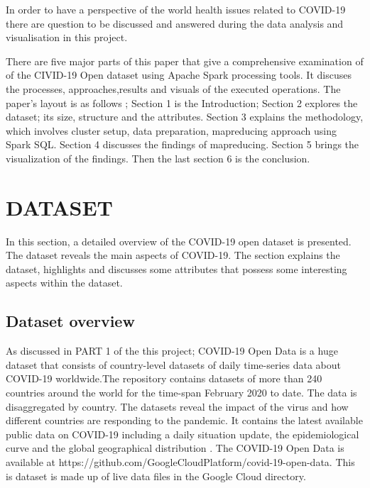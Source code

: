 \documentclass[12pt]{article}
\begin{document}
 In order to  have a perspective of the world health issues related to COVID-19 there are question to be discussed and answered during the data analysis and visualisation in this project.
 
There are five major parts of this paper that give a comprehensive examination of of the CIVID-19 Open dataset using Apache Spark processing tools. It discuses the processes, approaches,results and visuals of the executed operations. The paper's layout is as follows ; Section 1 is the Introduction; Section 2 explores the dataset; its size, structure and the attributes. Section 3 explains the methodology, which involves cluster setup, data preparation, mapreducing approach using Spark SQL. Section 4 discusses the findings of mapreducing. Section 5 brings the visualization of the findings. Then the last section 6 is the conclusion.

\section{DATASET}
 In this  section, a detailed overview of the COVID-19 open dataset is presented. The dataset reveals the main aspects of COVID-19. The section explains the dataset, highlights and discusses some attributes that possess some interesting aspects  within the dataset.

\subsection{Dataset overview}

 As discussed in PART 1 of the this project;  COVID-19 Open Data is a huge dataset that consists of country-level datasets of daily time-series data about COVID-19 worldwide.The repository contains datasets of more than 240 countries around the world for the time-span February 2020 to date\cite{covid-19}. The data is disaggregated  by country. The datasets reveal the impact of the virus and how different countries are responding to the pandemic.  It contains the latest available public data on COVID-19 including a daily situation update, the epidemiological curve and the global geographical distribution \cite{covid-19}. The COVID-19 Open Data is available at https://github.com/GoogleCloudPlatform/covid-19-open-data. This is dataset is made up of live data files in the Google Cloud directory.
\end{document}
